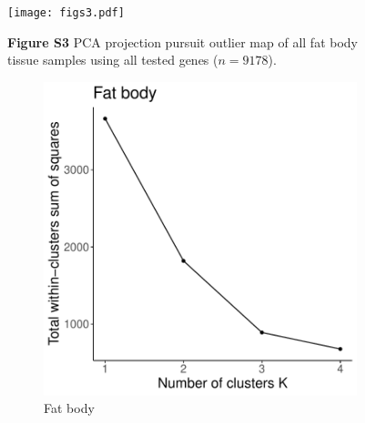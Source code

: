 \documentclass[12pt]{article}
\begin{document}
\pagebreak

\begin{figure}[ht]
    \centering
		\texttt{[image: figs3.pdf]} 
    \caption*{\textbf{Figure S3} \quad PCA projection pursuit outlier map of all fat body tissue samples using all tested genes ($n=9178$).}
    \label{fig:S3}
\end{figure}

\pagebreak

\begin{figure}[ht]
    \centering
    \begin{subfigure}[t]{0.45\textwidth}
        \centering
        \includegraphics[width=\linewidth]{figs4a.pdf} 
        \caption{Fat body} \label{fig:S4a}
    \end{subfigure}
    \hfill
    \begin{subfigure}[t]{0.45\textwidth}
        \centering

\end{subfigure}
\end{figure}
\end{document}
